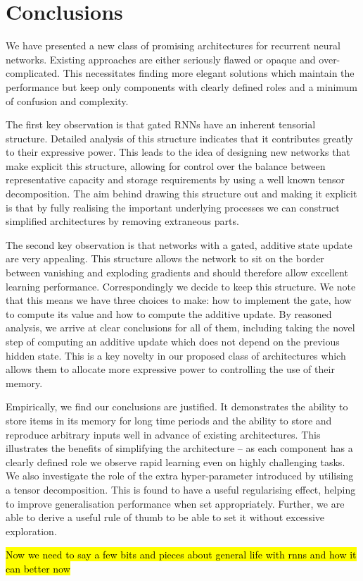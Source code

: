 \chapter{Conclusions}\label{C:con}
We have presented a new class of promising architectures for recurrent neural networks.
Existing approaches are either seriously flawed or opaque and over-complicated.
This necessitates finding more elegant solutions which maintain the performance but keep
only components with clearly defined roles and a minimum of confusion and complexity.

The first key observation is that gated RNNs have an inherent tensorial structure. Detailed
analysis of this structure indicates that it contributes greatly to their expressive power.
This leads to the idea of designing new networks that make explicit this structure, allowing
for control over the balance between representative capacity and storage requirements by using
a well known tensor decomposition. The aim behind drawing this structure out and making it
explicit is that by fully realising the important underlying processes we can construct simplified
architectures by removing extraneous parts.

The second key observation is that networks with a gated, additive state update are very appealing.
This structure allows the network to sit on the border between vanishing and
exploding gradients and should therefore allow excellent learning performance. Correspondingly we
decide to keep this structure. We note that this means we have three choices to make: how to implement
the gate, how to compute its value and how to compute the additive update. By reasoned analysis,
we arrive at clear conclusions for all of them, including taking the novel step of computing an
additive update which does not depend on the previous hidden state. This is a key novelty in our
proposed class of architectures which allows them to allocate more expressive power to controlling
the use of their memory.

Empirically, we find our conclusions are justified. It demonstrates the ability to store items in
its memory for long time periods and the ability to store and reproduce arbitrary inputs well in advance
of existing architectures. This illustrates the benefits of simplifying the architecture -- as each
component has a clearly defined role we observe rapid learning even on highly challenging tasks.
We also investigate the role of the extra hyper-parameter introduced by utilising a tensor decomposition.
This is found to have a useful regularising effect, helping to improve generalisation performance when
set appropriately. Further, we are able to derive a useful rule of thumb to be able to set it without
excessive exploration.

\hl{Now we need to say a few bits and pieces about general life with rnns and how it can better now}